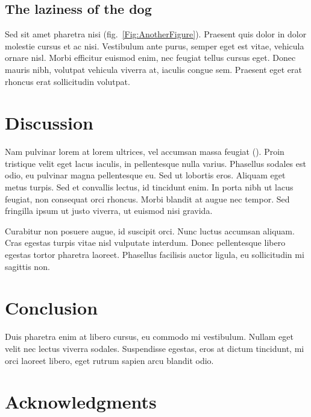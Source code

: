 \documentclass[11pt]{article}
\begin{document}
\subsection*{The laziness of the dog}

Sed sit amet pharetra nisi (fig.~\ref{Fig:AnotherFigure}). Praesent 
quis dolor in dolor molestie cursus et ac nisi. Vestibulum ante purus, 
semper eget est vitae, vehicula ornare nisl. Morbi efficitur euismod 
enim, nec feugiat tellus cursus eget. Donec mauris nibh, volutpat 
vehicula viverra at, iaculis congue sem. Praesent eget erat rhoncus erat 
sollicitudin volutpat. 

\section*{Discussion}

Nam pulvinar lorem at lorem ultrices, vel accumsan massa feugiat 
(\citealt{Ing11}). Proin tristique velit eget lacus iaculis, in 
pellentesque nulla varius. Phasellus sodales est odio, eu pulvinar 
magna pellentesque eu. Sed ut lobortis eros. Aliquam eget metus turpis. 
Sed et convallis lectus, id tincidunt enim. In porta nibh ut lacus 
feugiat, non consequat orci rhoncus. Morbi blandit at augue nec tempor. 
Sed fringilla ipsum ut justo viverra, ut euismod nisi gravida.

Curabitur non posuere augue, id suscipit orci. Nunc luctus accumsan 
aliquam. Cras egestas turpis vitae nisl vulputate interdum. Donec 
pellentesque libero egestas tortor pharetra laoreet. Phasellus facilisis 
auctor ligula, eu sollicitudin mi sagittis non.

\section*{Conclusion}

Duis pharetra enim at libero cursus, eu commodo mi vestibulum. Nullam 
eget velit nec lectus viverra sodales. Suspendisse egestas, eros at 
dictum tincidunt, mi orci laoreet libero, eget rutrum sapien arcu 
blandit odio.


\section*{Acknowledgments}
\end{document}
